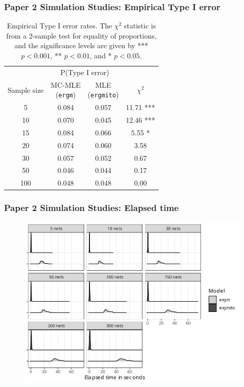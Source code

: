 \documentclass[aspectratio=169, 9pt]{beamer}\usepackage[]{graphicx}\usepackage[]{color}
\newcommand{\ergmpkg}[0]{\texttt{ergm}}
\newcommand{\ergmitopkg}[0]{\texttt{ergmito}}
\begin{document}
\begin{frame}
\frametitle{Paper 2 Simulation Studies: Empirical Type I error}

\footnotesize

\begin{table}[ht]
	\centering
	\begin{tabular}{cccc}
		\toprule & \multicolumn{2}{c}{P(Type I error)} \\ \cmidrule(r){2-3}
		Sample size  & \makecell{MC-MLE \\ (\ergmpkg{})} & \makecell{MLE \\ (\ergmitopkg{})} & $\chi^2$ \\ 
		\midrule
		5 & 0.084 & 0.057 & 11.71 *** \\ 
		10 & 0.070 & 0.045 & 12.46 *** \\ 
		15 & 0.084 & 0.066 & 5.55 * \\ 
		20 & 0.074 & 0.060 & 3.58  \\ 
		30 & 0.057 & 0.052 & 0.67  \\ 
		50 & 0.046 & 0.044 & 0.17  \\ 
		100 & 0.048 & 0.048 & 0.00  \\ 
		\bottomrule
	\end{tabular}
	\caption{\label{tab:typeI}Empirical Type I error rates. The $\chi^2$ statistic is from a 2-sample test for equality of proportions, and the significance levels are given by *** $p < 0.001$, ** $p < 0.01$, and * $p < 0.05$.} 
\end{table}

\end{frame}

\begin{frame}[label=ergmitoexperiment]
\frametitle{Paper 2 Simulation Studies: Elapsed time}

\begin{figure}
\centering
\includegraphics[width=.6\linewidth]{bias-elapsed-02-various-sizes-4-5-ttriad.pdf}
\end{figure}

\vfill\hfill\hyperlink{ergmito-bias}{}

\end{frame}
\end{document}
